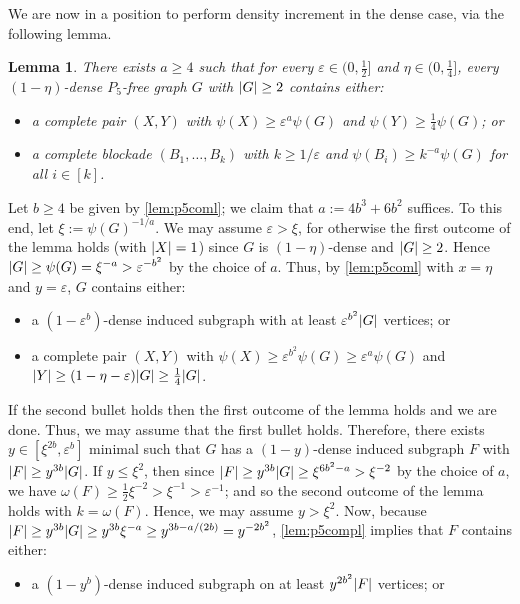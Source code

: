 \documentclass[11pt,reqno]{amsart}
\newtheorem{lemma}[theorem]{Lemma}
\let\oldendproof\endproof
\renewenvironment{proof}[1][\proofname]{%
	\oldproof[\normalfont\bfseries #1]%
}{\oldendproof}
\newcommand{\eps}{\varepsilon}
\DeclarePairedDelimiter\abs{\lvert}{\rvert}%
\begin{document}
	We are now in a position to perform density increment in the dense case, via the following lemma.
	\begin{lemma}
		\label{lem:dense}
		There exists $a\ge4$ such that for every $\eps \in(0,\frac12]$ and $\eta\in(0,\frac14]$, every $(1-\eta)$-dense $P_5$-free graph $G$ with $\abs G\ge2$ contains either:
		\begin{itemize}
			\item a complete pair $(X,Y)$ with $\psi(X)\ge\eps^a\psi(G)$ and $\psi(Y)\ge \frac14\psi(G)$; or
			
			\item a complete blockade $(B_1,\ldots,B_k)$ with $k\ge1/\eps$ and $\psi(B_i)\ge k^{-a}\psi(G)$ for all $i\in[k]$.
		\end{itemize}
	\end{lemma}
	\begin{proof}
		Let $b\ge4$ be given by \cref{lem:p5coml};
		we claim that $a:=4b^3+6b^2$ suffices.
		To this end, let $\xi:=\psi(G)^{-1/a}$.
		We may assume $\eps>\xi$, for otherwise the first outcome of the lemma holds (with $\abs X=1$) since $G$ is $(1-\eta)$-dense and $\abs G\ge2$.
		Hence $\abs G\ge \psi(G)=\xi^{-a}>\eps^{-b^2}$ by the choice of $a$.
		Thus, by \cref{lem:p5coml} with $x=\eta$ and $y=\eps$, $G$ contains either:
		\begin{itemize}
			\item a $(1-\eps^b)$-dense induced subgraph with at least $\eps^{b^2}\abs G$ vertices; or
			
			\item a complete pair $(X,Y)$ with $\psi(X)\ge \eps^{b^2}\psi(G)\ge \eps^a\psi(G)$ and $\abs Y\ge (1-\eta-\eps)\abs G\ge \frac14\abs G$.
		\end{itemize}
		
		If the second bullet holds then the first outcome of the lemma holds and we are done.
		Thus, we may assume that the first bullet holds.
		Therefore, there exists $y\in[\xi^{2b},\eps^b]$ minimal such that $G$ has a $(1-y)$-dense induced subgraph $F$ with $\abs F\ge y^{3b}\abs G$.
		If $y\le \xi^{2}$, then since $\abs F\ge y^{3b}\abs G\ge \xi^{6b^2-a}>\xi^{-2}$ by the choice of $a$, we have $\omega(F)\ge\frac12\xi^{-2}>\xi^{-1}>\eps^{-1}$; and so the second outcome of the lemma holds with $k=\omega(F)$.
		Hence, we may assume $y>\xi^{2}$.
		Now, because $\abs F\ge y^{3b}\abs G\ge y^{3b}\xi^{-a}\ge y^{3b-a/(2b)}= y^{-2b^2}$,
		\cref{lem:p5compl} implies that $F$ contains either:
		\begin{itemize}
			\item a $(1-y^b)$-dense induced subgraph on at least $y^{2b^2}\abs F$ vertices; or
			

\end{itemize}
\end{proof}
\end{document}
